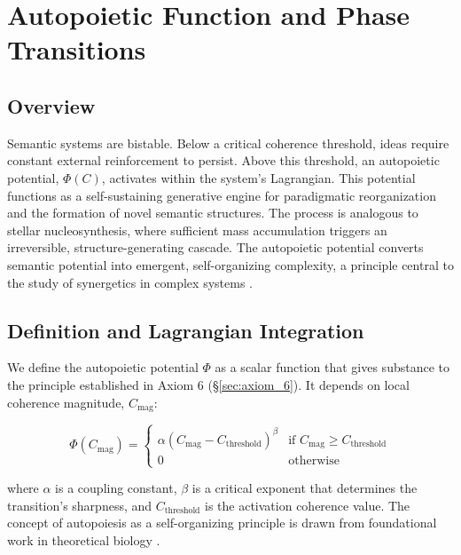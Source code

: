 \chapter{Autopoietic Function and Phase Transitions}
\label{ch:autopoietic_function_and_phase_transitions}


\section{Overview}

Semantic systems are bistable. Below a critical coherence threshold, ideas require constant external reinforcement to persist. Above this threshold, an autopoietic potential, \(\Phi(C)\), activates within the system's Lagrangian. This potential functions as a self-sustaining generative engine for paradigmatic reorganization and the formation of novel semantic structures. The process is analogous to stellar nucleosynthesis, where sufficient mass accumulation triggers an irreversible, structure-generating cascade. The autopoietic potential converts semantic potential into emergent, self-organizing complexity, a principle central to the study of synergetics in complex systems \autocite{Haken1983}.


\section{Definition and Lagrangian Integration}
\label{sec:definition_and_lagrangian_integration}

We define the autopoietic potential \(\Phi\) as a scalar function that gives substance to the principle established in Axiom 6 (\S\ref{sec:axiom_6}). It depends on local coherence magnitude, \(C_{\mathrm{mag}}\):

\begin{equation}\label{eq:autopoietic_potential}
\Phi(C_{\mathrm{mag}}) =
\begin{cases}
\alpha (C_{\mathrm{mag}} - C_{\text{threshold}})^{\beta} & \text{if } C_{\mathrm{mag}} \geq C_{\text{threshold}} \\
0 & \text{otherwise}
\end{cases}
\end{equation}

where \(\alpha\) is a coupling constant, \(\beta\) is a critical exponent that determines the transition's sharpness, and \(C_{\text{threshold}}\) is the activation coherence value. The concept of autopoiesis as a self-organizing principle is drawn from foundational work in theoretical biology \autocite{MaturanaVarela1980}.

